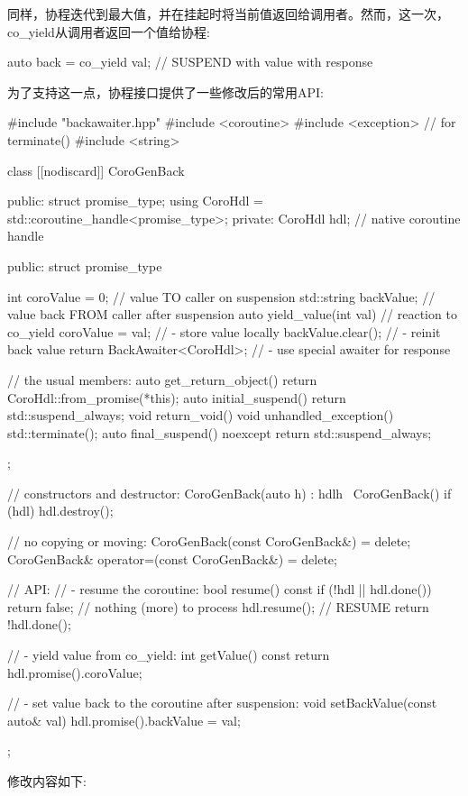 同样，协程迭代到最大值，并在挂起时将当前值返回给调用者。然而，这一次，co\_yield从调用者返回一个值给协程:

\begin{cpp}
auto back = co_yield val; // SUSPEND with value with response
\end{cpp}

为了支持这一点，协程接口提供了一些修改后的常用API:


\begin{cpp}
#include "backawaiter.hpp"
#include <coroutine>
#include <exception> // for terminate()
#include <string>

class [[nodiscard]] CoroGenBack {
public:
	struct promise_type;
	using CoroHdl = std::coroutine_handle<promise_type>;
private:
	CoroHdl hdl; // native coroutine handle
	
public:
	struct promise_type {
		int coroValue = 0; // value TO caller on suspension
		std::string backValue; // value back FROM caller after suspension
		auto yield_value(int val) { // reaction to co_yield
			coroValue = val; // - store value locally
			backValue.clear(); // - reinit back value
			return BackAwaiter<CoroHdl>{}; // - use special awaiter for response
		}
		
		// the usual members:
		auto get_return_object() { return CoroHdl::from_promise(*this); }
		auto initial_suspend() { return std::suspend_always{}; }
		void return_void() { }
		void unhandled_exception() { std::terminate(); }
		auto final_suspend() noexcept { return std::suspend_always{}; }
	};
	
	// constructors and destructor:
	CoroGenBack(auto h) : hdl{h} { }
	~CoroGenBack() { if (hdl) hdl.destroy(); }
	
	// no copying or moving:
	CoroGenBack(const CoroGenBack&) = delete;
	CoroGenBack& operator=(const CoroGenBack&) = delete;
	
	// API:
	// - resume the coroutine:
	bool resume() const {
	if (!hdl || hdl.done()) {
		return false; // nothing (more) to process
	}
	hdl.resume(); // RESUME
	return !hdl.done();
	}
	
	// - yield value from co_yield:
	int getValue() const {
		return hdl.promise().coroValue;
	}
	
	// - set value back to the coroutine after suspension:
	void setBackValue(const auto& val) {
		hdl.promise().backValue = val;
	}
};
\end{cpp}

修改内容如下:

